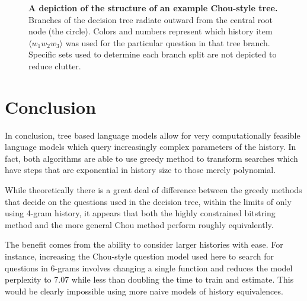 \documentclass[12pt]{article}
\begin{document}
\begin{figure}
  \centering
  \caption{\textbf{A depiction of the structure of an example
      Chou-style tree.} Branches of the decision tree radiate outward
    from the central root node (the circle). Colors and numbers
    represent which history item $\langle w_1 w_2 w_3 \rangle$ was
    used for the particular question in that tree branch. Specific
    sets used to determine each branch split are not depicted to
    reduce clutter.}
  \label{fig:chou-tree}
\end{figure}

\section{Conclusion}

In conclusion, tree based language models allow for very
computationally feasible language models which query increasingly
complex parameters of the history. In fact, both algorithms are able
to use greedy method to transform searches which have steps that are
exponential in history size to those merely polynomial.

While theoretically there is a great deal of difference between the
greedy methods that decide on the questions used in the decision tree,
within the limits of only using 4-gram history, it appears that both
the highly constrained bitstring method and the more general Chou
method perform roughly equivalently. 

The benefit comes from the ability to consider larger histories with
ease. For instance, increasing the Chou-style question model used here
to search for questions in 6-grams involves changing a single function
and reduces the model perplexity to 7.07 while less than doubling the
time to train and estimate. This would be clearly impossible using
more naive models of history equivalences.
\end{document}
